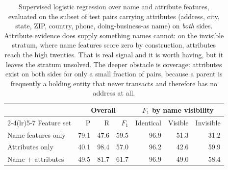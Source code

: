 \begin{table}[t]
\centering
\small
\begin{tabular}{lrrrrrr}
\toprule
& \multicolumn{3}{c}{Overall} & \multicolumn{3}{c}{$F_1$ by name visibility} \\
\cmidrule(lr){2-4}\cmidrule(lr){5-7}
Feature set & P & R & $F_1$ & Identical & Visible & Invisible \\
\midrule
Name features only & 79.1 & 47.6 & 59.5 & 96.9 & 51.3 & 31.2 \\
Attributes only & 40.1 & 98.4 & 57.0 & 96.2 & 42.6 & 59.9 \\
Name $+$ attributes & 49.5 & 81.7 & 61.7 & 96.9 & 49.0 & 58.4 \\
\bottomrule
\end{tabular}
\caption{Supervised logistic regression over name and attribute features, evaluated on
the subset of test pairs carrying attributes (address, city, state, ZIP, country,
phone, doing-business-as name) on \emph{both} sides. Attribute evidence does supply
something names cannot: on the invisible stratum, where name features score zero by
construction, attributes reach the high twenties. That is real signal and it is worth
having, but it leaves the stratum unsolved. The deeper obstacle is coverage: attributes
exist on both sides for only a small fraction of pairs, because a parent is frequently a
holding entity that never transacts and therefore has no address at all.}
\label{tab:multiattribute}
\end{table}
